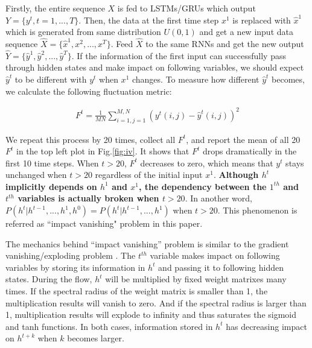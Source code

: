 \documentclass[10pt,twocolumn,letterpaper]{article}
\begin{document}
Firstly, the entire sequence $X$ is fed to LSTMs/GRUs which output $Y=\{y^{t}, t=1,...,T\}$. Then, the data at the first time step $x^1$ is replaced with $\hat{x}^1$ which is generated from same distribution $ U (0,1)$ and get a new input data sequence $\hat{X} = \{ \hat{x}^1, x^2,...,x^T   \}$. Feed $\hat{X}$ to the same RNNs and get the new output $\hat{Y}=\{ \hat{y}^1, \hat{y}^2,...,\hat{y}^T \}$. If the information of the first input can successfully pass through hidden states and make impact on following variables, we should expect $\hat{y}^t$ to be different with $y^t$ when $x^1$ changes. To measure how different $\hat{y}^t$ becomes, we calculate the following fluctuation metric:

\begin{gather}
  F^t = \frac{1}{MN} \sum_{i=1,j=1}^{M,N} ( y^t(i,j) - \hat{y}^{t}(i,j) ) ^2
\end{gather}

We repeat this process by 20 times, collect all $F^t$, and report the mean of all 20 $F^t$ in the top left plot in Fig.\ref{fig:iv}. It shows that  $F^t$ drops dramatically in the first 10 time steps. When $t>20$, $F^t$ decreases to zero, which means that $y^t$ stays unchanged when $t>20$ regardless of the initial input $x^1$. \textbf{Although $h^t$ implicitly depends on $h^1$ and $x^1$, the dependency between the $1^{th}$ and $t^{th}$ variables is actually broken when $t>20$}. In another word, $P(h^t|h^{t-1},..., h^1, h^0) = P(h^t|h^{t-1},..., h^1)$ when $t>20$. This phenomenon is referred as ``impact vanishing" problem in this paper. 

The mechanics behind ``impact vanishing'' problem is similar to the gradient vanishing/exploding problem \cite{12}. The $t^{th}$ variable makes impact on following variables by storing its information in $h^t$ and passing it to following hidden states. During the flow, $h^t$ will be multiplied by fixed weight matrixes many times. If the spectral radius of the weight matrix is smaller than 1, the multiplication results will vanish to zero. And if the spectral radius is larger than 1, multiplication results will explode to infinity and thus saturates the sigmoid and tanh functions. In both cases, information stored in $h^t$ has decreasing impact on $h^{t+k}$ when $k$ becomes larger.
\end{document}
